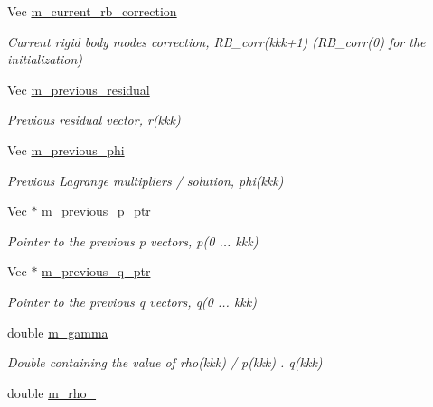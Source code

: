 \begin{DoxyCompactItemize}
Vec \hyperlink{classcarl_1_1_f_e_t_i___operations_a482c32e0a89fe4c8aca206ec4e04c67a}{m\+\_\+current\+\_\+rb\+\_\+correction}
\begin{DoxyCompactList}\small\item\em Current rigid body modes correction, {\ttfamily R\+B\+\_\+corr(kkk+1)} ({\ttfamily R\+B\+\_\+corr(0)} for the initialization) \end{DoxyCompactList}\item 
Vec \hyperlink{classcarl_1_1_f_e_t_i___operations_a3097f0040b5f00a717883840c95ca7e6}{m\+\_\+previous\+\_\+residual}
\begin{DoxyCompactList}\small\item\em Previous residual vector, {\ttfamily r(kkk)} \end{DoxyCompactList}\item 
Vec \hyperlink{classcarl_1_1_f_e_t_i___operations_a55eed597eea536ba6d7956267b178a89}{m\+\_\+previous\+\_\+phi}
\begin{DoxyCompactList}\small\item\em Previous Lagrange multipliers / solution, {\ttfamily phi(kkk)} \end{DoxyCompactList}\item 
Vec $\ast$ \hyperlink{classcarl_1_1_f_e_t_i___operations_acc8155a94e5289396768f891b9c29627}{m\+\_\+previous\+\_\+p\+\_\+ptr}
\begin{DoxyCompactList}\small\item\em Pointer to the previous {\ttfamily p} vectors, {\ttfamily p(0 ... kkk)} \end{DoxyCompactList}\item 
Vec $\ast$ \hyperlink{classcarl_1_1_f_e_t_i___operations_a7ff19f8422276b403c971d31611945c5}{m\+\_\+previous\+\_\+q\+\_\+ptr}
\begin{DoxyCompactList}\small\item\em Pointer to the previous {\ttfamily q} vectors, {\ttfamily q(0 ... kkk)} \end{DoxyCompactList}\item 
double \hyperlink{classcarl_1_1_f_e_t_i___operations_a619c40aa27c7aa1e82feed9e8780991f}{m\+\_\+gamma}
\begin{DoxyCompactList}\small\item\em Double containing the value of {\ttfamily rho(kkk) / p(kkk) . q(kkk)} \end{DoxyCompactList}\item 
double \hyperlink{classcarl_1_1_f_e_t_i___operations_a7d44cceb8c3e003f9e8c22972602fcc8}{m\+\_\+rho\+\_}

\end{DoxyCompactItemize}
